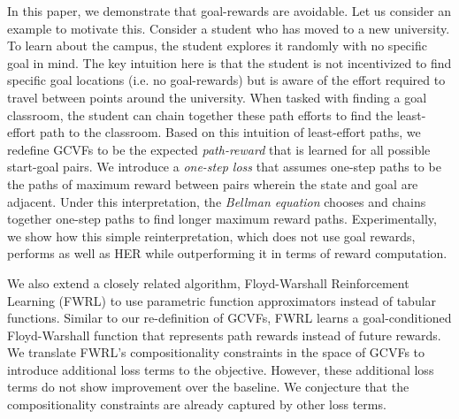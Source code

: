 %
In this paper, we demonstrate that goal-rewards are 
avoidable. Let us consider an example to motivate this. Consider a student who has moved
to a new university. To learn about the campus, the student explores it
randomly with no specific goal in mind. The key intuition here is that
the student is not incentivized to find specific goal locations (i.e.
no goal-rewards) but is aware of the effort required to travel between
points around the university. When tasked with
finding a goal classroom, the student can chain together these
path efforts to find the least-effort path to the
classroom. 
%
Based on this intuition of least-effort paths, we redefine GCVFs to be
the expected \emph{path-reward} that is learned for all possible
start-goal pairs. We  
introduce a \emph{one-step loss} that assumes one-step paths 
to be the paths of maximum reward between pairs wherein the state and goal are adjacent.
Under this interpretation, the \emph{Bellman equation} chooses and chains
together one-step paths to find longer maximum reward paths. 
%
Experimentally, we show how this simple reinterpretation, which does not use goal
rewards, performs as well as HER while outperforming it in terms of
reward computation.

We also extend a closely related algorithm, Floyd-Warshall Reinforcement
Learning (FWRL) \citep{dhiman2018floydwarshall} to use parametric
function approximators instead of tabular functions. Similar to our
re-definition of GCVFs, FWRL learns a goal-conditioned Floyd-Warshall function
that represents path rewards instead of future rewards.
We translate FWRL's compositionality constraints in the space of GCVFs to introduce
additional loss terms to the objective. However, these additional loss
terms do not show improvement over the baseline. We conjecture that the
compositionality constraints are already captured by other loss terms. 

